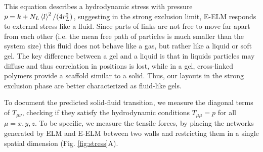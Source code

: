 \documentclass[nofootinbib,preprint,floatfix,titlepage,endfloats]{revtex4} %
\begin{document}
This equation describes a hydrodynamic stress with pressure $ p =  k + {N_L \left<l\right>^2/( 4r_L^2)}$, suggesting in the strong exclusion limit, E-ELM responds to external stress like a fluid. Since parts of links are not free to move far apart from each other (i.e. the mean free path of particles is much smaller than the system size) this fluid does not behave like a gas, but rather like a liquid or soft gel. The key difference between a gel and a liquid is that in liquids particles may diffuse and thus correlation in positions is lost, while in a gel, cross-linked polymers provide a scaffold similar to a solid. Thus, our layouts in the strong exclusion phase are better characterized as fluid-like gels.  

To document the predicted solid-fluid transition, we measure the diagonal terms of $T_{\mu\nu}$, checking if they satisfy the hydrodynamic conditions $T_{\mu\mu}=p$ for all $\mu=x,y,z$. 
To be specific, we measure the tensile forces, by placing the networks generated by ELM and E-ELM between two walls and restricting them in a single spatial dimension (Fig. \ref{fig:stress}A). 
\end{document}
